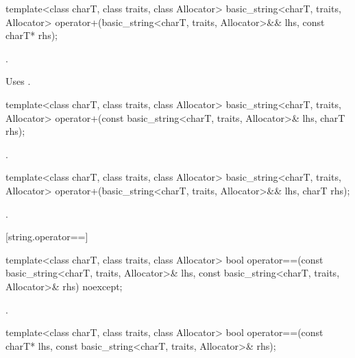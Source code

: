 %
\begin{itemdecl}
template<class charT, class traits, class Allocator>
  basic_string<charT, traits, Allocator>
    operator+(basic_string<charT, traits, Allocator>&& lhs,
              const charT* rhs);
\end{itemdecl}

\begin{itemdescr}
\pnum
\returns
{}.

\pnum
\remarks
Uses
.
\end{itemdescr}

%
\begin{itemdecl}
template<class charT, class traits, class Allocator>
  basic_string<charT, traits, Allocator>
    operator+(const basic_string<charT, traits, Allocator>& lhs,
              charT rhs);
\end{itemdecl}

\begin{itemdescr}
\pnum
\returns
{}.
\end{itemdescr}

%
\begin{itemdecl}
template<class charT, class traits, class Allocator>
  basic_string<charT, traits, Allocator>
    operator+(basic_string<charT, traits, Allocator>&& lhs,
              charT rhs);
\end{itemdecl}

\begin{itemdescr}
\pnum
\returns
{}.
\end{itemdescr}

[string.operator==]{}

%
\begin{itemdecl}
template<class charT, class traits, class Allocator>
  bool operator==(const basic_string<charT, traits, Allocator>& lhs,
                  const basic_string<charT, traits, Allocator>& rhs) noexcept;
\end{itemdecl}

\begin{itemdescr}
\pnum
\returns
{}.
\end{itemdescr}

%
\begin{itemdecl}
template<class charT, class traits, class Allocator>
  bool operator==(const charT* lhs,
                  const basic_string<charT, traits, Allocator>& rhs);
\end{itemdecl}

